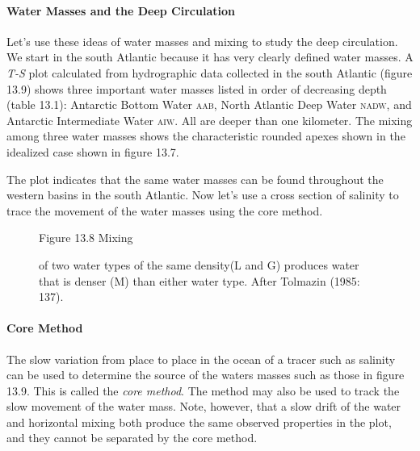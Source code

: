 \paragraph{Water Masses and the Deep Circulation}
Let's use these ideas of water masses and
mixing to study the deep circulation. We start in the south
Atlantic because it has very clearly defined water masses. A \textit{T-S} plot calculated from
hydrographic data collected in the south
Atlantic (figure 13.9) shows three important water masses listed in order of decreasing depth
(table 13.1): Antarctic Bottom Water \textsc{aab}, North
Atlantic Deep Water \textsc{nadw}, and Antarctic Intermediate Water \textsc{aiw}. All are deeper than
one kilometer. The mixing among three water masses shows the
characteristic rounded apexes shown in the idealized case shown in figure 13.7.

The plot indicates that the same water masses can be found throughout the
western basins in the south Atlantic. Now let's use a cross section of salinity
to trace the movement of the water masses using the core method.

\begin{figure}[t!]
\centering
\footnotesize
Figure 13.8 Mixing \rule{0pt}{3ex} of two water types of the same
density(L and G)  produces water that is denser (M) than either water type. After
Tolmazin (1985: 137).

\label{fig:densification}
\end{figure}

\paragraph{Core Method}
The slow variation from place to place in the ocean of a tracer such as salinity can be used to
determine the source of the waters masses such as those in figure 13.9. This is called the
\textit{core method}. The method may also be used to track the slow
movement of the water mass. Note, however, that a slow drift of the water and horizontal
mixing both produce the same observed properties in the plot, and
they cannot be separated by the core method.

